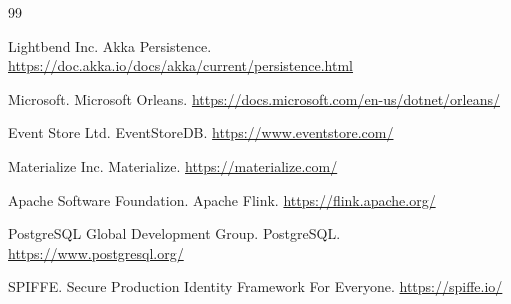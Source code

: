 \documentclass{article}
\begin{document}
\begin{thebibliography}{99}

Lightbend Inc. Akka Persistence. \url{https://doc.akka.io/docs/akka/current/persistence.html}

Microsoft. Microsoft Orleans. \url{https://docs.microsoft.com/en-us/dotnet/orleans/}

Event Store Ltd. EventStoreDB. \url{https://www.eventstore.com/}

Materialize Inc. Materialize. \url{https://materialize.com/}

Apache Software Foundation. Apache Flink. \url{https://flink.apache.org/}

PostgreSQL Global Development Group. PostgreSQL. \url{https://www.postgresql.org/}

SPIFFE. Secure Production Identity Framework For Everyone. \url{https://spiffe.io/}

\end{thebibliography}
\end{document}

